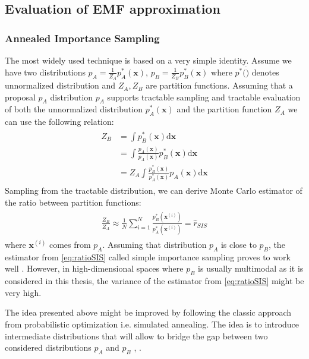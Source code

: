 \documentclass[../report/report.tex]{subfiles}
\begin{document}
\subsection{Evaluation of EMF approximation}
\subsubsection{Annealed Importance Sampling }
The most widely used technique is based on a very simple identity. Assume we have two distributions $p_A= \frac{1}{Z_A}p_A^*(\mathbf{x})$, $p_B= \frac{1}{Z_B}p_B^*(\mathbf{x})$ where $p^*(\dot)$ denotes unnormalized distribution and $Z_A, Z_B$ are partition functions. Assuming that a proposal $p_A$ distribution $p_A$ supports tractable sampling and tractable evaluation of both the unnormalized distribution $p_A^*(\mathbf{x})$ and the partition function $Z_A$ we can use the following relation:
\begin{align}
\begin{split}
Z_B & = \int p^*_B(\mathbf{x}) \text{d} \mathbf{x} \\ 
 &= \int \frac{p_A(\mathbf{x})}{p_A(\mathbf{x})} p^*_B(\mathbf{x}) \text{d} \mathbf{x}\\
 &=  Z_A \int \frac{ p^*_B(\mathbf{x}) }{ p^*_A(\mathbf{x}) }p_A(\mathbf{x})  \text{d} \mathbf{x} 
\end{split}
\end{align}
Sampling from the tractable distribution, we can derive Monte Carlo estimator of the ratio between partition functions:
\begin{align}
\begin{split}
\frac{Z_B}{Z_A} \approx \frac{1}{N} \sum_{i=1}^N \frac{ p^*_B(\mathbf{x}^{(i)}) }{ p^*_A(\mathbf{x}^{(i)}) } = \hat{r}_{SIS}
\label{eq:ratioSIS}
\end{split}
\end{align}
where $\mathbf{x}^{(i)}$ comes from $p_A$.
Assuming that distribution $p_A$ is close to $p_B$, the estimator from  \ref{eq:ratioSIS} called simple importance sampling proves to work well \cite{minka2005divergence}. However, in high-dimensional spaces where $p_B$ is usually multimodal as it is considered in this thesis, the variance of the estimator from \ref{eq:ratioSIS} might be very high. 

The idea presented above might be improved by following the classic approach  from probabilistic optimization i.e. simulated annealing. The idea is to introduce intermediate distributions that will allow to bridge the gap between two considered distributions $p_A$ and $p_B$ \cite{jarzynski1997nonequilibrium}, \cite{neal2001annealed}.
\end{document}
